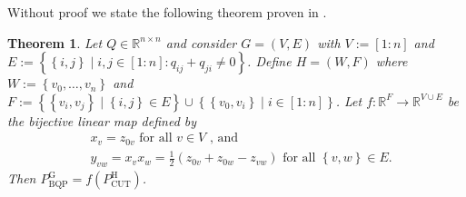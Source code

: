 \documentclass[12pt,a4paper]{article}
\theoremstyle{mythm}
\newtheorem{thm}{Theorem}[section]
\begin{document}
Without proof we state the following theorem proven in \cite{DeSimone1990}.
\begin{thm}
\label{thm:simone} 
Let $ Q \in \mathbb{R} ^{ n \times n }  $ and consider $ G = ( V,E ) $ with $ V := \left[ 1 : n \right] $ and $ E := \left\{ \left\{ i,j \right\}  \mid i,j \in \left[ 1:n
\right] : q _{ ij } + q _{ ji } \neq 0   \right\}  $. Define $ H = \left( W,F \right)  $ where $ W:= \left\{ v_0, \dots , v_n \right\}  $ and $ F := \left\{ \left\{ v_i,v_j
\right\}  \mid \left\{ i,j \right\} \in E \right\} \cup \left\{ \left\{ v_0,v_i \right\} \mid i \in \left[ 1:n \right]  \right\} $. 
Let $ f : \mathbb{R} ^{ F  }  \to \mathbb{R} ^{ V \cup E }  $ be the bijective linear map defined by
\begin{align*}
&x_v = z _{ 0v } \text{ for all } v \in V \text{ , and } \\
&y _{ vw } = x_v x_w = \frac{ 1 }{ 2 } \left( z _{ 0v } + z _{ 0w } - z _{ vw }  \right) \text{ for all  } \left\{ v,w \right\} \in E.
\end{align*}  
Then $ P ^{ \text{G}  }  _{ \text{BQP}  } = f \left( P ^{ \text{H}  } _{ \text{CUT}  }  \right)   $.
\end{thm} 
\end{document}
